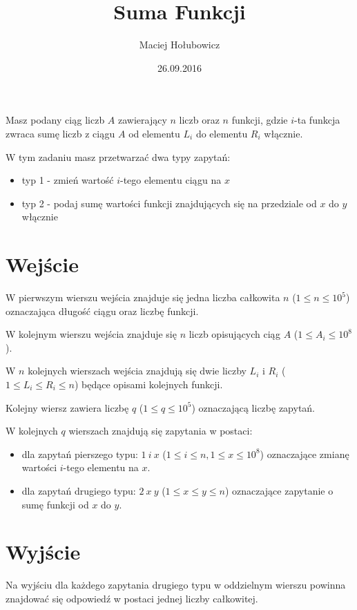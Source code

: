 \documentclass[zad,zawodnik,utf8]{sinol}
\title{Suma Funkcji}
\author{Maciej Hołubowicz} %
\date{26.09.2016}
\begin{document}
  \begin{tasktext}%
  Masz podany ciąg liczb $A$ zawierający $n$ liczb oraz $n$ funkcji, gdzie $i$-ta funkcja zwraca sumę liczb z ciągu $A$ od elementu $L_i$ do elementu $R_i$ włącznie.
 
  W tym zadaniu masz przetwarzać dwa typy zapytań:
	\begin{itemize}
  	\item typ 1 - zmień wartość $i$-tego elementu ciągu na $x$
  	\item typ 2 - podaj sumę wartości funkcji znajdujących się na przedziale od $x$ do $y$ włącznie
	\end{itemize}
  
 \section{Wejście}
    
W pierwszym wierszu wejścia znajduje się jedna liczba całkowita $n$ ($1 \leq n \leq 10^5$) oznaczająca długość ciągu oraz liczbę funkcji.

W kolejnym wierszu wejścia znajduje się $n$ liczb opisujących ciąg $A$ ($1 \leq A_i \leq 10^8$).

W $n$ kolejnych wierszach wejścia znajdują się dwie liczby $L_i$ i $R_i$ ($ 1 \leq L_i \leq R_i \leq n$) będące opisami kolejnych funkcji.

Kolejny wiersz zawiera liczbę $q$ ($1 \leq q \leq 10^5$) oznaczającą liczbę zapytań.

W kolejnych $q$ wierszach znajdują się zapytania w postaci:
  \begin{itemize}
  	\item dla zapytań pierszego typu: $1~i~x$ ($1 \leq i \leq n, 1 \leq x \leq 10^8$) oznaczające zmianę wartości $i$-tego elementu na $x$.
  	\item dla zapytań drugiego typu: $2~x~y$ ($1 \leq x \leq y \leq n$) oznaczające zapytanie o sumę funkcji od $x$ do $y$.
  \end{itemize}

  \section{Wyjście}
    Na wyjściu dla każdego zapytania drugiego typu w oddzielnym wierszu powinna znajdować się odpowiedź w postaci jednej liczby całkowitej.
    
     \makecompactexample

  \end{tasktext}
\end{document}
